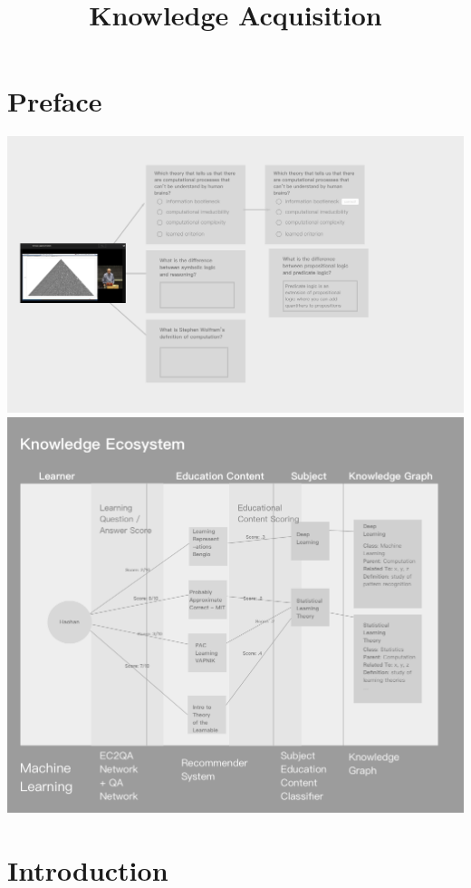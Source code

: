 \documentclass{acm_proc_article-sp}
\title{Knowledge Acquisition}
\author{
\alignauthor Fanli (Christian) Zheng \\
        \affaddr{dyad x machina}\\
       \email{\href{mailto:thechristianramsey@gmail.com}{\nolinkurl{thechristianramsey@gmail.com}}}
\and \alignauthor Haohan Wang \\
        \affaddr{dyad x machina}\\
       \email{\href{mailto:haohan723@gmail.com}{\nolinkurl{haohan723@gmail.com}}}
\and }
\date{}
\begin{document}
\maketitle


\section*{Preface}\label{preface}

\includegraphics{img/MtoQA.png}
\includegraphics{img/knowledgeEcosystem.png}

\section{Introduction}\label{introduction}
\end{document}
